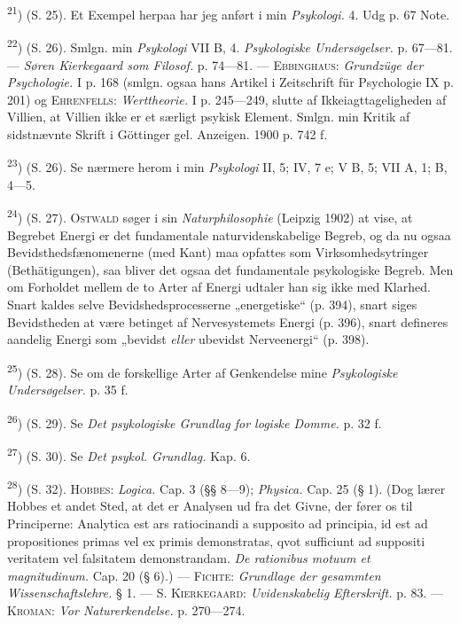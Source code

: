 \documentclass[12pt,a4paper,openany]{book}
\begin{document}
\begin{small}
\textsuperscript{21}) (S. 25). Et Exempel herpaa har jeg anført i min
\textit{Psykologi.} 4. Udg p. 67 Note.

\textsuperscript{22}) (S. 26). Smlgn. min \textit{Psykologi} VII B, 4.
\textit{Psykologiske Undersøgelser.} p. 67---81. --- \textit{Søren Kierkegaard
som Filosof.} p. 74---81. --- \textsc{Ebbinghaus}: \textit{Grundzüge der
Psychologie.} I p. 168 (smlgn. ogsaa hans Artikel i Zeitschrift für Psychologie
IX p. 201) og \textsc{Ehrenfells}: \textit{Werttheorie.} I p. 245---249, slutte
af Ikkeiagttageligheden af Villien, at Villien ikke er et særligt psykisk
Element. Smlgn. min Kritik af sidstnævnte Skrift i Göttinger gel. Anzeigen.
1900 p. 742 f.

\textsuperscript{23}) (S. 26). Se nærmere herom i min \textit{Psykologi} II, 5;
IV, 7 e; V B, 5; VII A, 1; B, 4---5.

\textsuperscript{24}) (S. 27). \textsc{Ostwald} søger i sin
\textit{Naturphilosophie} (Leipzig 1902) at vise, at Begrebet Energi er det
fundamentale naturvidenskabelige Begreb, og da nu ogsaa Bevidsthedsfænomenerne
(med Kant) maa opfattes som Virksomhedsytringer (Bethätigungen), saa bliver det
ogsaa det fundamentale psykologiske Begreb. Men om Forholdet mellem de to Arter
af Energi udtaler han sig ikke med Klarhed. Snart kaldes selve
Bevidshedsprocesserne „energetiske“ (p. 394), snart siges Bevidstheden at være
betinget af Nervesystemets Energi (p. 396), snart defineres aandelig Energi som
„bevidst \textit{eller} ubevidst Nerveenergi“ (p. 398).

\textsuperscript{25}) (S. 28). Se om de forskellige Arter af Genkendelse mine
\textit{Psykologiske Undersøgelser.} p. 35 f.

\textsuperscript{26}) (S. 29). Se \textit{Det psykologiske Grundlag for logiske
Domme.} p. 32 f.

\textsuperscript{27}) (S. 30). Se \textit{Det psykol. Grundlag.} Kap. 6.

\textsuperscript{28}) (S. 32). \textsc{Hobbes}: \textit{Logica.} Cap. 3 (§§
8---9); \textit{Physica.} Cap. 25 (§ 1). (Dog lærer Hobbes et andet Sted, at
det er Analysen ud fra det Givne, der fører os til Principerne: Analytica est
ars ratiocinandi a supposito ad principia, id est ad propositiones primas vel
ex primis demonstratas, qvot sufficiunt ad suppositi veritatem vel falsitatem
demonstrandam. \textit{De rationibus motuum et magnitudinum.} Cap. 20 (§ 6).)
--- \textsc{Fichte}: \textit{Grundlage der gesammten Wissenschaftslehre.} § 1.
--- \textsc{S. Kierkegaard}: \textit{Uvidenskabelig Efterskrift.} p. 83. ---
\textsc{Kroman}: \textit{Vor Naturerkendelse.} p. 270---274.


\end{small}
\end{document}
